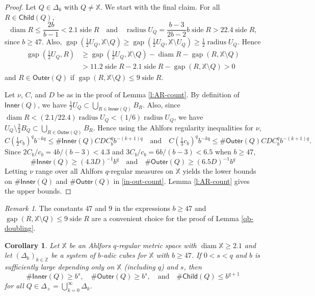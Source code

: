 \documentclass[12pt]{amsart}
\newtheorem{corollary}[theorem]{Corollary}
\theoremstyle{definition}
\theoremstyle{remark}
\newtheorem{remark}[theorem]{Remark}
\newcommand{\ZZ}{\mathbb{Z}}
\newcommand{\XX}{\mathbb{X}}
\newcommand{\diam}{\mathop\mathrm{diam}\nolimits}
\newcommand{\side}{\mathop\mathrm{side}\nolimits}
\newcommand{\gap}{\mathop\mathrm{gap}\nolimits}
\newcommand{\Child}{\mathsf{Child}}
\newcommand{\Outer}{\mathsf{Outer}}
\newcommand{\Inner}{\mathsf{Inner}}
\newcommand{\radius}{\mathop\mathrm{radius}\nolimits}
\numberwithin{figure}{section}
\numberwithin{equation}{section}
\begin{document}
\begin{proof} Let $Q\in\Delta_k$ with $Q\neq \XX$. We start with the final claim. For all $R\in\Child(Q)$, $$\diam R\leq \frac{2b}{b-1}<2.1\side R\quad\text{and}\quad\radius U_Q=\frac{b-3}{2b-2} b\side R> 22.4\side R,$$ since $b\geq 47$. Also, $\gap(\frac{1}{2}U_Q,\XX\setminus Q)\geq \gap (\frac{1}{2} U_Q,\XX\setminus U_Q)\geq \frac{1}{2}\radius U_Q$. Hence \begin{equation*}\begin{split}\gap(\tfrac{1}{2}U_Q,R)&\geq \gap(\tfrac{1}{2}U_Q,\XX\setminus Q)-\diam R-\gap(R,\XX\setminus Q)\\ &> 11.2\side R-2.1\side R - \gap(R,\XX\setminus Q)>0\end{split}\end{equation*} and $R\in\Outer(Q)$ if $\gap(R,\XX\setminus Q)\leq 9 \side R$.

Let $\nu$, $C$, and $D$ be as in the proof of Lemma \ref{l:AR-count}. By definition of $\Inner(Q)$, we have $\frac{1}{2} U_Q\subset \bigcup_{R\in\Inner(Q)} B_R$. Also, since $\diam R<(2.1/22.4)\radius U_Q<(1/6)\radius U_Q$, we have $U_Q\setminus \frac23B_Q\subset \bigcup_{R\in\Outer(Q)} B_R$.  Hence using the Ahlfors regularity inequalities for $\nu$, $$C(\tfrac{1}{2}c_b)^qb^{-kq} \leq \#\Inner(Q)CDC_b^qb^{-(k+1)q}\quad\text{and}\quad C(\tfrac{1}{3}c_b)^qb^{-kq}\leq \#\Outer(Q) CDC_b^{q}b^{-(k+1)q}.$$ Since $2C_b/c_b=4b/(b-3)< 4.3$ and $3C_b/c_b=6b/(b-3)< 6.5$ when $b\geq 47$, \begin{equation} \#\Inner(Q) \geq (4.3D)^{-1}b^q\quad\text{and}\quad \#\Outer(Q)\geq (6.5D)^{-1}b^q \end{equation} Letting $\nu$ range over all Ahlfors $q$-regular measures on $\XX$ yields the lower bounds on $\#\Inner(Q)$ and $\#\Outer(Q)$ in \eqref{in-out-count}. Lemma \ref{l:AR-count} gives the upper bounds.
\end{proof}

\begin{remark} The constants $47$ and $9$ in the expressions $b\geq 47$ and $\gap(R,\XX\setminus Q)\leq 9\side R$ are a convenient choice for the proof of Lemma \ref{qb-doubling}.\end{remark}

\begin{corollary} \label{c:good-count} Let $\XX$ be an Ahlfors $q$-regular metric space with $\diam\XX\geq 2.1$ and let $(\Delta_k)_{k\in\ZZ}$ be a system of $b$-adic cubes for $\XX$ with $b\geq 47$. If $0<s<q$ and $b$ is sufficiently large depending only on $\XX$ (including $q$) and $s$, then \begin{equation}\label{good-count} \#\Inner(Q)\geq b^s,\quad \#\Outer(Q)\geq b^s, \quad\text{and}\quad \#\Child(Q)\leq b^{q+1}\end{equation} for all $Q\in\Delta_+=\bigcup_{k=0}^\infty \Delta_k$.
\end{corollary}
\end{document}
